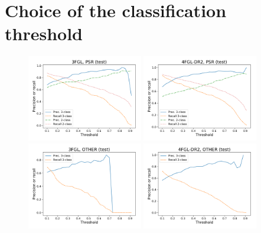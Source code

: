 \section{Choice of the classification threshold}

\begin{figure}[h]
\centering
\hspace*{-0.5cm}
\includegraphics[width=0.45\textwidth]{plots/thresholds/thresholds_prec_recall_3FGL_PSR.pdf}
\includegraphics[width=0.45\textwidth]{plots/thresholds/thresholds_prec_recall_4FGL-DR2_PSR.pdf} \\ 
\includegraphics[width=0.45\textwidth]{plots/thresholds/thresholds_prec_recall_3FGL_OTHER.pdf}
\includegraphics[width=0.45\textwidth]{plots/thresholds/thresholds_prec_recall_4FGL-DR2_OTHER.pdf}

\end{figure}
